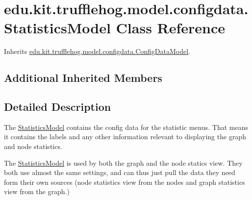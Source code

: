 \hypertarget{classedu_1_1kit_1_1trufflehog_1_1model_1_1configdata_1_1_statistics_model}{}\section{edu.\+kit.\+trufflehog.\+model.\+configdata.\+Statistics\+Model Class Reference}
\label{classedu_1_1kit_1_1trufflehog_1_1model_1_1configdata_1_1_statistics_model}


Inherits \hyperlink{classedu_1_1kit_1_1trufflehog_1_1model_1_1configdata_1_1_config_data_model}{edu.\+kit.\+trufflehog.\+model.\+configdata.\+Config\+Data\+Model}.

\subsection*{Additional Inherited Members}


\subsection{Detailed Description}
The \hyperlink{classedu_1_1kit_1_1trufflehog_1_1model_1_1configdata_1_1_statistics_model}{Statistics\+Model} contains the config data for the statistic menus. That means it contains the labels and any other information relevant to displaying the graph and node statistics. 

The \hyperlink{classedu_1_1kit_1_1trufflehog_1_1model_1_1configdata_1_1_statistics_model}{Statistics\+Model} is used by both the graph and the node statics view. They both use almost the same settings, and can thus just pull the data they need form their own sources (node statistics view from the nodes and graph statistics view from the graph.) 